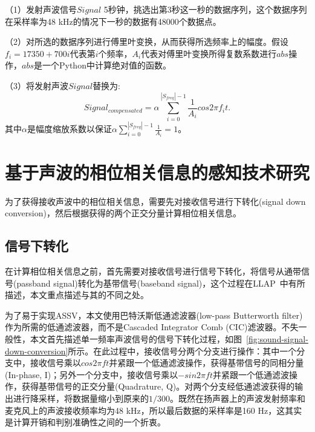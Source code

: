 （1）发射声波信号$Signal$ 5秒钟，挑选出第3秒这一秒的数据序列，这个数据序列在采样率为48 kHz的情况下一秒的数据有48000个数据点。

（2）对所选的数据序列进行傅里叶变换，从而获得所选频率上的幅度。假设$f_{i} = 17350 + 700i$代表第$i$个频率，$A_{i}$代表对傅里叶变换所得复数系数进行$abs$操作，$abs$是一个Python中计算绝对值的函数。

（3）将发射声波$Signal$替换为:
\begin{equation}
Signal_{compensated}=\alpha \sum_{i=0}^{|S_{freq}|-1} \frac{1}{A_i} cos 2\pi f_{i}t.
\end{equation}
其中$\alpha$是幅度缩放系数以保证$\alpha \sum_{i=0}^{|S_{freq}|-1}\frac{1}{A_i}=1$。

\section{基于声波的相位相关信息的感知技术研究}\label{sec:sensing-research}
为了获得接收声波中的相位相关信息，需要先对接收信号进行下转化(signal down conversion)，然后根据获得的两个正交分量计算相位相关信息。

\subsection{信号下转化}
在计算相位相关信息之前，首先需要对接收信号进行信号下转化，将信号从通带信号(passband signal)转化为基带信号(baseband signal)，这个过程在LLAP~\cite{wang2016device}中有所描述，本文重点描述与其的不同之处。

为了易于实现ASSV，本文使用巴特沃斯低通滤波器(low-pass Butterworth filter)作为所需的低通滤波器，而不是Cascaded Integrator Comb (CIC)滤波器。不失一般性，本文首先描述单一频率声波信号的信号下转化过程，如图~\ref{fig:sound-signal-down-conversion}所示。在此过程中，接收信号分两个分支进行操作：其中一个分支中，接收信号乘以$cos2\pi ft$并紧跟一个低通滤波操作，获得基带信号的同相分量(In-phase, I)；另外一个分支中，接收信号乘以$-sin2\pi ft$并紧跟一个低通滤波操作，获得基带信号的正交分量(Quadrature, Q)。对两个分支经低通滤波获得的输出进行降采样，将数据量缩小到原来的$1/300$。既然在扬声器上的声波发射频率和麦克风上的声波接收频率均为48 kHz，所以最后数据的采样率是160 Hz，这其实是计算开销和判别准确性之间的一个折衷。

